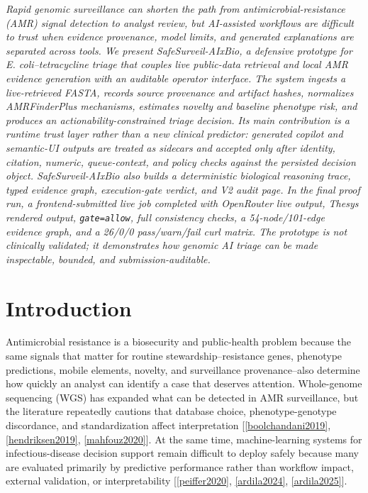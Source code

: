 \documentclass[11pt, letterpaper]{article}
\newcommand{\project}{SafeSurveil-AIxBio}
\begin{document}
\begin{center}
\begin{minipage}{0.78\textwidth}
\noindent\textit{Rapid genomic surveillance can shorten the path from antimicrobial-resistance (AMR) signal detection to analyst review, but AI-assisted workflows are difficult to trust when evidence provenance, model limits, and generated explanations are separated across tools. We present \project, a defensive prototype for \textit{E. coli}--tetracycline triage that couples live public-data retrieval and local AMR evidence generation with an auditable operator interface. The system ingests a live-retrieved FASTA, records source provenance and artifact hashes, normalizes AMRFinderPlus mechanisms, estimates novelty and baseline phenotype risk, and produces an actionability-constrained triage decision. Its main contribution is a runtime trust layer rather than a new clinical predictor: generated copilot and semantic-UI outputs are treated as sidecars and accepted only after identity, citation, numeric, queue-context, and policy checks against the persisted decision object. \project{} also builds a deterministic biological reasoning trace, typed evidence graph, execution-gate verdict, and V2 audit page. In the final proof run, a frontend-submitted live job completed with OpenRouter live output, Thesys rendered output, \texttt{gate=allow}, full consistency checks, a 54-node/101-edge evidence graph, and a 26/0/0 pass/warn/fail curl matrix. The prototype is not clinically validated; it demonstrates how genomic AI triage can be made inspectable, bounded, and submission-auditable.}
\end{minipage}
\end{center}
\vspace{0.45cm}

\section{Introduction}

Antimicrobial resistance is a biosecurity and public-health problem because the same signals that matter for routine stewardship--resistance genes, phenotype predictions, mobile elements, novelty, and surveillance provenance--also determine how quickly an analyst can identify a case that deserves attention. Whole-genome sequencing (WGS) has expanded what can be detected in AMR surveillance, but the literature repeatedly cautions that database choice, phenotype-genotype discordance, and standardization affect interpretation [\ref{boolchandani2019}, \ref{hendriksen2019}, \ref{mahfouz2020}]. At the same time, machine-learning systems for infectious-disease decision support remain difficult to deploy safely because many are evaluated primarily by predictive performance rather than workflow impact, external validation, or interpretability [\ref{peiffer2020}, \ref{ardila2024}, \ref{ardila2025}].
\end{document}
